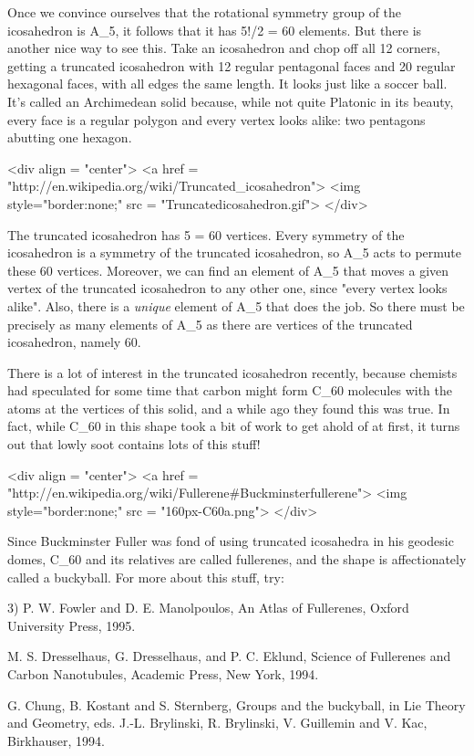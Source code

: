 Once we convince ourselves that the rotational symmetry group of the
icosahedron is A_{5}, it follows that it has 5!/2 = 60 elements.  But
there is another nice way to see this.  Take an icosahedron and chop off
all 12 corners, getting a truncated icosahedron with 12 regular
pentagonal faces and 20 regular hexagonal faces, with all edges the same
length.  It looks just like a soccer ball.  It's called an Archimedean
solid because, while not quite Platonic in its beauty, every face is a
regular polygon and every vertex looks alike: two pentagons abutting one
hexagon.  

<div align = "center">
<a href = "http://en.wikipedia.org/wiki/Truncated_icosahedron">
<img style="border:none;" src = "Truncatedicosahedron.gif">
</div>

The truncated icosahedron has 5  = 60 vertices.  Every symmetry of
the icosahedron is a symmetry of the truncated icosahedron, so
A_{5} acts to permute these 60 vertices.  Moreover, we can find
an element of A_{5} that moves a given vertex of the truncated
icosahedron to any other one, since "every vertex looks
alike".  Also, there is a \emph{unique} element of A_{5}
that does the job.  So there must be precisely as many elements of
A_{5} as there are vertices of the truncated icosahedron, namely
60.

There is a lot of interest in the truncated icosahedron recently,
because chemists had speculated for some time that carbon might form
C_{60} molecules with the atoms at the vertices of this solid,
and a while ago they found this was true.  In fact, while
C_{60} in this shape took a bit of work to get ahold of at
first, it turns out that lowly soot contains lots of this stuff!

<div align = "center">
<a href = "http://en.wikipedia.org/wiki/Fullerene#Buckminsterfullerene">
<img style="border:none;" src = "160px-C60a.png">
</div>


Since Buckminster Fuller was fond of using truncated icosahedra in his
geodesic domes, C_{60} and its relatives are called
fullerenes, and the shape is affectionately called a buckyball.  For
more about this stuff, try:

3) P. W. Fowler and D. E. Manolpoulos, An Atlas of Fullerenes, Oxford
University Press, 1995.

M. S. Dresselhaus, G. Dresselhaus, and P. C. Eklund, Science of
Fullerenes and Carbon Nanotubules, Academic Press, New York, 1994.  

G. Chung, B. Kostant and S. Sternberg, Groups and the buckyball, in Lie
Theory and Geometry, eds. J.-L. Brylinski, R. Brylinski, V. Guillemin
and V. Kac, Birkhauser, 1994.  

